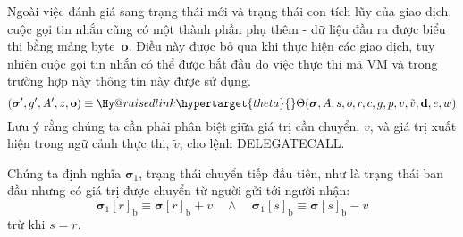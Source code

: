 \documentclass[9pt,oneside]{amsart}
\makeatletter
\newcommand{\linkdest}[1]{\Hy@raisedlink{\hypertarget{#1}{}}}
\makeatother
\begin{document}
\begin{multicols}{2}
Ngoài việc đánh giá sang trạng thái mới và trạng thái con tích lũy của giao dịch, cuộc gọi tin nhắn cũng có một thành phần phụ thêm - dữ liệu đầu ra được biểu thị bằng mảng byte~$\mathbf{o}$. Điều này được bỏ qua khi thực hiện các giao dịch, tuy nhiên cuộc gọi tin nhắn có thể được bắt đầu do việc thực thi mã VM và trong trường hợp này thông tin này được sử dụng.
\begin{equation}
(\boldsymbol{\sigma}', g', A', z, \mathbf{o}) \equiv \linkdest{theta}{\Theta}(\boldsymbol{\sigma}, A, s, o, r, c, g, p, v, \tilde{v}, \mathbf{d}, e, w)
\end{equation}
Lưu ý rằng chúng ta cần phải phân biệt giữa giá trị cần chuyển, $v$, và giá trị xuất hiện trong ngữ cảnh thực thi, $\tilde{v}$, cho lệnh {\small DELEGATECALL}.

Chúng ta định nghĩa $\boldsymbol{\sigma}_1$, trạng thái chuyển tiếp đầu tiên, như là trạng thái ban đầu nhưng có giá trị được chuyển từ người gửi tới người nhận:
\begin{equation}
\boldsymbol{\sigma}_1[r]_{\mathrm{b}} \equiv \boldsymbol{\sigma}[r]_{\mathrm{b}} + v \quad\wedge\quad \boldsymbol{\sigma}_1[s]_{\mathrm{b}} \equiv \boldsymbol{\sigma}[s]_{\mathrm{b}} - v
\end{equation}
trừ khi $s = r$.


\end{multicols}
\end{document}
